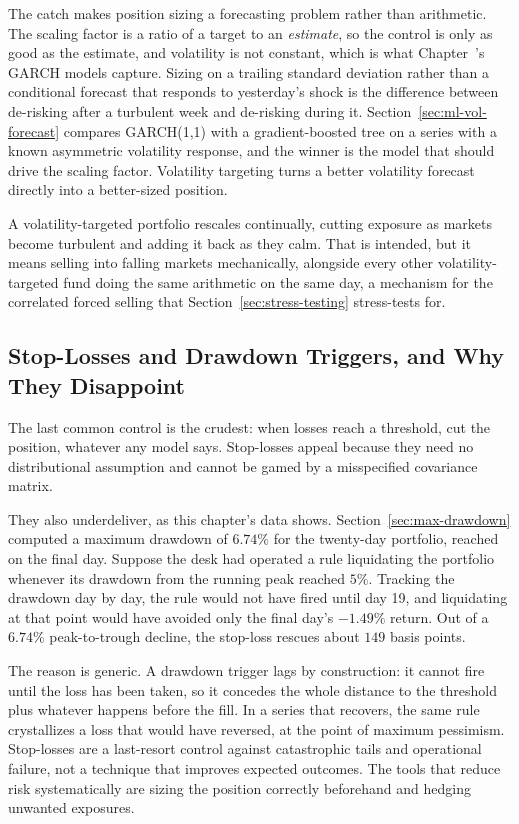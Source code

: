 \documentclass[../ai_in_finance]{subfiles}
\begin{document}
The catch makes position sizing a forecasting problem rather than arithmetic. The scaling factor is a ratio of a target to an \emph{estimate}, so the control is only as good as the estimate, and volatility is not constant, which is what Chapter~'s GARCH models capture. Sizing on a trailing standard deviation rather than a conditional forecast that responds to yesterday's shock is the difference between de-risking after a turbulent week and de-risking during it. Section~\ref{sec:ml-vol-forecast} compares GARCH(1,1) with a gradient-boosted tree on a series with a known asymmetric volatility response, and the winner is the model that should drive the scaling factor. Volatility targeting turns a better volatility forecast directly into a better-sized position.

A volatility-targeted portfolio rescales continually, cutting exposure as markets become turbulent and adding it back as they calm. That is intended, but it means selling into falling markets mechanically, alongside every other volatility-targeted fund doing the same arithmetic on the same day, a mechanism for the correlated forced selling that Section~\ref{sec:stress-testing} stress-tests for.

\subsection{Stop-Losses and Drawdown Triggers, and Why They Disappoint}
\label{sec:stop-losses}

The last common control is the crudest: when losses reach a threshold, cut the position, whatever any model says. Stop-losses appeal because they need no distributional assumption and cannot be gamed by a misspecified covariance matrix.

They also underdeliver, as this chapter's data shows. Section~\ref{sec:max-drawdown} computed a maximum drawdown of $6.74\%$ for the twenty-day portfolio, reached on the final day. Suppose the desk had operated a rule liquidating the portfolio whenever its drawdown from the running peak reached $5\%$. Tracking the drawdown day by day, the rule would not have fired until day 19, and liquidating at that point would have avoided only the final day's $-1.49\%$ return. Out of a $6.74\%$ peak-to-trough decline, the stop-loss rescues about $149$ basis points.

The reason is generic. A drawdown trigger lags by construction: it cannot fire until the loss has been taken, so it concedes the whole distance to the threshold plus whatever happens before the fill. In a series that recovers, the same rule crystallizes a loss that would have reversed, at the point of maximum pessimism. Stop-losses are a last-resort control against catastrophic tails and operational failure, not a technique that improves expected outcomes. The tools that reduce risk systematically are sizing the position correctly beforehand and hedging unwanted exposures.
\end{document}
